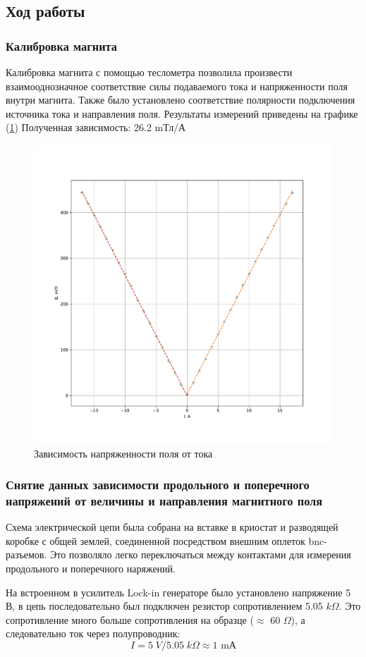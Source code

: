 \documentclass[a4paper, 12pt]{article}
\begin{document}
\subsection{Ход работы}

\subsubsection{Калибровка магнита}

Калибровка магнита с помощью теслометра позволила произвести взаимооднозначное соответствие силы подаваемого тока и напряженности поля внутри магнита. Также было установлено соответствие полярности подключения источника тока и направления поля. Результаты измерений приведены на графике (\ref{fig:3_calib}) Полученная зависимость: 26.2 mТл/А

\begin{figure}[H]
	\centering
	\includegraphics[width=0.7\linewidth]{3_Calibration.pdf}
	\caption{Зависимость напряженности поля от тока}
	\label{fig:3_calib}
\end{figure}

\subsubsection{Снятие данных зависимости продольного и поперечного напряжений от величины и направления магнитного поля }
Схема электрической цепи была собрана на вставке в криостат и разводящей коробке с общей землей, соединенной посредством внешним оплеток bnc-разъемов. Это позволяло легко переключаться между контактами для измерения продольного и поперечного  наряжений.

На встроенном в усилитель Lock-in генераторе было установлено напряжение 5 В, в цепь последовательно был подключен резистор сопротивлением 5.05 $k\Omega$. Это сопротивление много больше сопротивления на образце ($\approx$ 60 $\Omega$), а следовательно ток через полупроводник: $$I=5 \;V/5.05 \; k\Omega\approx 1\text{ mА}$$
\end{document}
